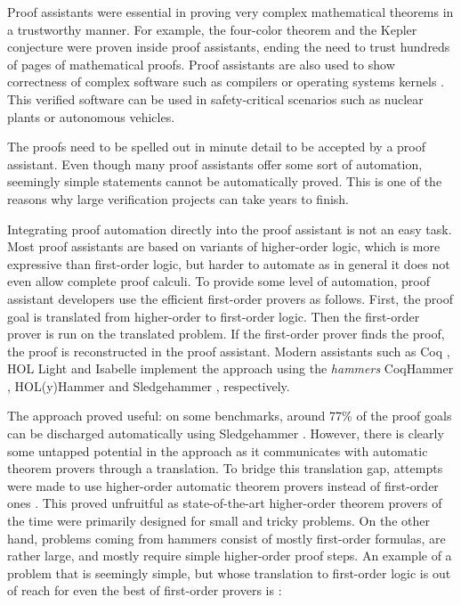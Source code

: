 Proof assistants were essential in proving very complex mathematical theorems in a
trustworthy manner. For example, the four-color theorem \cite{gg-2008-four-color}
and the Kepler conjecture \cite{th-2015-kepler} were proven inside proof assistants,
ending the need to trust hundreds of pages of mathematical proofs. Proof
assistants are also used to show correctness of complex software such as
compilers \cite{xl-09-compcert} or operating systems kernels \cite{gk-09-sel4}.
This verified software can be used in safety-critical scenarios such as nuclear
plants or autonomous vehicles.

The proofs need to be spelled out in minute detail to be accepted by a proof assistant.
Even though many proof assistants offer some sort of automation, seemingly simple
statements cannot be automatically proved. This is one of the reasons why large
verification projects can take years to finish.

Integrating proof automation directly into the proof assistant is not an easy task.
Most proof assistants are based on variants of higher-order logic, which is more
expressive than first-order logic, but harder to automate as in general it does not even allow complete
proof calculi. To provide some level of automation, proof assistant developers
use the efficient first-order provers as follows. First, the proof goal is
translated from higher-order to first-order logic. Then the first-order prover
is run on the translated problem. If the first-order prover finds the proof, the
proof is reconstructed in the proof assistant. Modern assistants such as Coq \cite{bc-04-coq}, HOL Light \cite{jh-09-hol-light}
and Isabelle \cite{lc-88-isabelle} implement the approach using the \emph{hammers} CoqHammer
\cite{ck-18-coqhammer}, HOL(y)Hammer \cite{ku-15-holyhammer} and Sledgehammer
\cite{bn-10-sh}, respectively. 

The approach proved useful: on some benchmarks, around 77\% of the proof goals can be
discharged automatically using Sledgehammer \cite{bgkku-16-larning-fact-selector}. However, there is
clearly some untapped potential in the approach as it communicates with
automatic theorem provers through a translation. To bridge this translation gap,
attempts were made to use higher-order automatic theorem provers instead of
first-order ones \cite{ns-13-leo2sh}. This proved unfruitful as state-of-the-art
higher-order theorem provers of the time were primarily designed for small and
tricky problems. On the other hand, problems coming from hammers consist of
mostly first-order formulas, are rather large, and mostly require simple
higher-order proof steps. An example of a problem that is seemingly simple, but whose translation to first-order logic
is out of reach for even the best of first-order provers is \cite{bbbntvw-2x-mechanical-mathematicians}:

